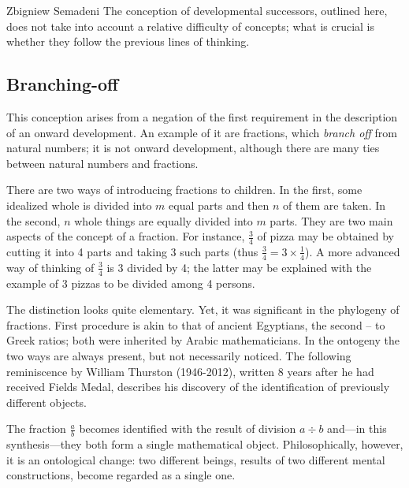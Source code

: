 \begin{artengenv}{Zbigniew Semadeni}
The conception of developmental successors, outlined here, does not take into account 
a relative difficulty of concepts; what is crucial is whether they follow the previous 
lines of thinking. 

\subsection{Branching-off}
This conception arises from a negation of the first requirement in the description 
of an onward development. An example of it are fractions, which \textit{branch off} 
from natural numbers; it is not onward development, although there are many ties 
between natural numbers and fractions. 

There are two ways of introducing fractions to children. In the first, some 
idealized whole is divided into $m$ equal parts and then $n$ of them are taken. 
In the second, $n$ whole things are equally divided into $m$ parts. 
They are two main aspects of the concept of a fraction. For instance, $\frac{3}{4}$ 
of pizza may be obtained by cutting it into 4 parts and taking 3 such parts 
(thus $\frac{3}{4} = 3 \times \frac{1}{4}$). A more advanced way of thinking of 
$\frac{3}{4}$ is 3 divided by 4; the latter may be explained with the example 
of 3 pizzas to be divided among 4 persons. 

The distinction looks quite elementary. Yet, it was significant in the phylogeny 
of fractions. First procedure is akin to that of ancient Egyptians, the 
second -- to Greek ratios; both were inherited by Arabic mathematicians. In the 
ontogeny the two ways are always present, but not necessarily noticed. The 
following reminiscence by William Thurston (1946-2012), written 8 years after 
he had received Fields Medal, describes his discovery of the identification of 
previously different objects. 


\noindent The fraction $\frac{a}{b}$ becomes identified with the result of division 
$a\div b$ and---in this synthesis---they both form a single mathematical object. 
Philosophically, however, it is an ontological change: two different beings, results 
of two different mental constructions, become regarded as a single one. 


\end{artengenv}
